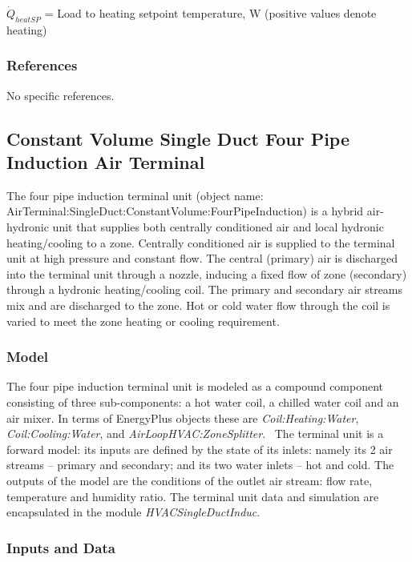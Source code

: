 \({\dot Q_{heatSP}}\) = Load to heating setpoint temperature, W (positive values denote heating)

\subsubsection{References}\label{references-001}

No specific references.

\subsection{Constant Volume Single Duct Four Pipe Induction Air Terminal}\label{constant-volume-single-duct-four-pipe-induction-air-terminal}

The four pipe induction terminal unit (object name: \\ AirTerminal:SingleDuct:ConstantVolume:FourPipeInduction) is a hybrid air-hydronic unit that supplies both centrally conditioned air and local hydronic heating/cooling to a zone. Centrally conditioned air is supplied to the terminal unit at high pressure and constant flow. The central (primary) air is discharged into the terminal unit through a nozzle, inducing a fixed flow of zone (secondary) through a hydronic heating/cooling coil. The primary and secondary air streams mix and are discharged to the zone. Hot or cold water flow through the coil is varied to meet the zone heating or cooling requirement.

\subsubsection{Model}\label{model}

The four pipe induction terminal unit is modeled as a compound component consisting of three sub-components: a hot water coil, a chilled water coil and an air mixer. In terms of EnergyPlus objects these are \emph{Coil:Heating:Water}, \emph{Coil:Cooling:Water}, and \emph{AirLoopHVAC:ZoneSplitter}.~ The terminal unit is a forward model: its inputs are defined by the state of its inlets: namely its 2 air streams -- primary and secondary; and its two water inlets -- hot and cold. The outputs of the model are the conditions of the outlet air stream: flow rate, temperature and humidity ratio. The terminal unit data and simulation are encapsulated in the module \emph{HVACSingleDuctInduc}.

\subsubsection{Inputs and Data}\label{inputs-and-data}

